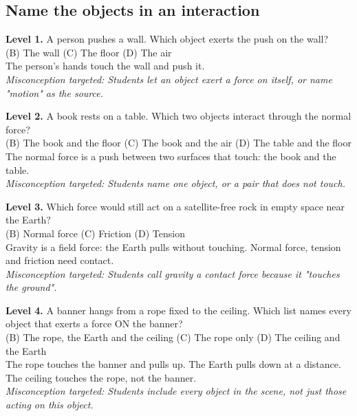 \documentclass[11pt]{article}
\begin{document}
\subsection*{Name the objects in an interaction}
\noindent\textbf{Level 1.} A person pushes a wall. Which object exerts the push on the wall?\\  \quad (B) The wall \quad (C) The floor \quad (D) The air\\  \quad The person's hands touch the wall and push it.\\ \textit{Misconception targeted: Students let an object exert a force on itself, or name "motion" as the source.}\par\medskip
\noindent\textbf{Level 2.} A book rests on a table. Which two objects interact through the normal force?\\  \quad (B) The book and the floor \quad (C) The book and the air \quad (D) The table and the floor\\  \quad The normal force is a push between two surfaces that touch: the book and the table.\\ \textit{Misconception targeted: Students name one object, or a pair that does not touch.}\par\medskip
\noindent\textbf{Level 3.} Which force would still act on a satellite-free rock in empty space near the Earth?\\  \quad (B) Normal force \quad (C) Friction \quad (D) Tension\\  \quad Gravity is a field force: the Earth pulls without touching. Normal force, tension and friction need contact.\\ \textit{Misconception targeted: Students call gravity a contact force because it "touches the ground".}\par\medskip
\noindent\textbf{Level 4.} A banner hangs from a rope fixed to the ceiling. Which list names every object that exerts a force ON the banner?\\  \quad (B) The rope, the Earth and the ceiling \quad (C) The rope only \quad (D) The ceiling and the Earth\\  \quad The rope touches the banner and pulls up. The Earth pulls down at a distance. The ceiling touches the rope, not the banner.\\ \textit{Misconception targeted: Students include every object in the scene, not just those acting on this object.}\par\medskip
\end{document}
